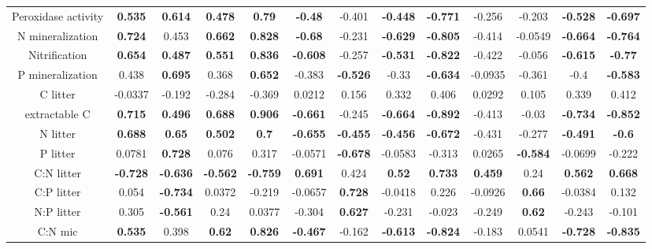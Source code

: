 \documentclass[authoryear,preprint,review,12pt]{elsarticle}
\begin{document}
\begin{landscape}
\begin{table}[h!]
\begin{center}
{\begin{tabular}{ccccccccccccc}
  Peroxidase activity & \textbf{ 0.535 } & \textbf{ 0.614 } & \textbf{ 0.478 } & \textbf{ 0.79 } & \textbf{ -0.48 } & -0.401 & \textbf{ -0.448 } & \textbf{ -0.771 } & -0.256 & -0.203 & \textbf{ -0.528 } & \textbf{ -0.697 } \\ 
  N mineralization & \textbf{ 0.724 } & 0.453 & \textbf{ 0.662 } & \textbf{ 0.828 } & \textbf{ -0.68 } & -0.231 & \textbf{ -0.629 } & \textbf{ -0.805 } & -0.414 & -0.0549 & \textbf{ -0.664 } & \textbf{ -0.764 } \\ 
  Nitrification & \textbf{ 0.654 } & \textbf{ 0.487 } & \textbf{ 0.551 } & \textbf{ 0.836 } & \textbf{ -0.608 } & -0.257 & \textbf{ -0.531 } & \textbf{ -0.822 } & -0.422 & -0.056 & \textbf{ -0.615 } & \textbf{ -0.77 } \\ 
  P mineralization & 0.438 & \textbf{ 0.695 } & 0.368 & \textbf{ 0.652 } & -0.383 & \textbf{ -0.526 } & -0.33 & \textbf{ -0.634 } & -0.0935 & -0.361 & -0.4 & \textbf{ -0.583 } \\ 
  C litter & -0.0337 & -0.192 & -0.284 & -0.369 & 0.0212 & 0.156 & 0.332 & 0.406 & 0.0292 & 0.105 & 0.339 & 0.412 \\ 
  extractable C & \textbf{ 0.715 } & \textbf{ 0.496 } & \textbf{ 0.688 } & \textbf{ 0.906 } & \textbf{ -0.661 } & -0.245 & \textbf{ -0.664 } & \textbf{ -0.892 } & -0.413 & -0.03 & \textbf{ -0.734 } & \textbf{ -0.852 } \\ 
  N litter & \textbf{ 0.688 } & \textbf{ 0.65 } & \textbf{ 0.502 } & \textbf{  0.7 } & \textbf{ -0.655 } & \textbf{ -0.455 } & \textbf{ -0.456 } & \textbf{ -0.672 } & -0.431 & -0.277 & \textbf{ -0.491 } & \textbf{ -0.6 } \\ 
  P litter & 0.0781 & \textbf{ 0.728 } & 0.076 & 0.317 & -0.0571 & \textbf{ -0.678 } & -0.0583 & -0.313 & 0.0265 & \textbf{ -0.584 } & -0.0699 & -0.222 \\ 
  C:N litter & \textbf{ -0.728 } & \textbf{ -0.636 } & \textbf{ -0.562 } & \textbf{ -0.759 } & \textbf{ 0.691 } & 0.424 & \textbf{ 0.52 } & \textbf{ 0.733 } & \textbf{ 0.459 } & 0.24 & \textbf{ 0.562 } & \textbf{ 0.668 } \\ 
  C:P litter & 0.054 & \textbf{ -0.734 } & 0.0372 & -0.219 & -0.0657 & \textbf{ 0.728 } & -0.0418 & 0.226 & -0.0926 & \textbf{ 0.66 } & -0.0384 & 0.132 \\ 
  N:P litter & 0.305 & \textbf{ -0.561 } & 0.24 & 0.0377 & -0.304 & \textbf{ 0.627 } & -0.231 & -0.023 & -0.249 & \textbf{ 0.62 } & -0.243 & -0.101 \\ 
  C:N mic & \textbf{ 0.535 } & 0.398 & \textbf{ 0.62 } & \textbf{ 0.826 } & \textbf{ -0.467 } & -0.162 & \textbf{ -0.613 } & \textbf{ -0.824 } & -0.183 & 0.0541 & \textbf{ -0.728 } & \textbf{ -0.835 } \\ 

\end{tabular}}
\end{center}
\end{table}
\end{landscape}
\end{document}
